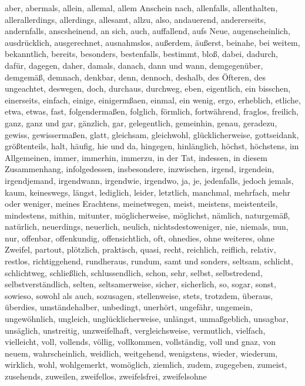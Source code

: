 \documentclass[a4paper,titlepage=true,twoside]{scrartcl}
\begin{document}
\begin{small}
aber, abermals, allein, allemal, allem Anschein nach, allenfalls, allenthalten,
allerallerdings, allerdings, allesamt, allzu, also, andauerend, andererseits,
andernfalls, anscsheinend, an sich, auch, auffallend, aufs Neue, augenscheinlich,
ausdrücklich, ausgerechnet, ausnahmslos, außerdem, äußerst, beinahe, bei weitem,
bekanntlich, bereits, besonders, bestenfalls, bestimmt, bloß, dabei,
dadurch, dafür, dagegen, daher, damals, danach, dann und wann, demgegenüber,
demgemäß, demnach, denkbar, denn, dennoch, deshalb, des Öfteren, des ungeachtet,
deswegen, doch, durchaus, durchweg, eben, eigentlich, ein bisschen, einerseits,
einfach, einige, einigermßaen, einmal, ein wenig, ergo, erheblich, etliche,
etwa, etwas, fast, folgendermaßen, folglich, förmlich, fortwährend, fraglos,
freilich, ganz, ganz und gar, gänzlich, gar, gelegentlich, gemeinhin,
genau, geradezu, gewiss, gewissermaßen, glatt, gleichsam, gleichwohl, 
glücklicherweise, gottseidank, größtenteils, halt, häufig, hie und da,
hingegen, hinlänglich, höchst, höchstens, im Allgemeinen, immer, immerhin, 
immerzu, in der Tat, indessen, in diesem Zusammenhang, infolgedessen,
insbesondere, inzwischen, irgend, irgendein, irgendjemand, irgendwann,
irgendwie, irgendwo, ja, je, jedenfalls, jedoch jemals, kaum, keineswegs,
längst, lediglich, leider, letztlich, manchmal, mehrfach, mehr oder weniger,
meines Erachtens, meinetwegen, meist, meistens, meistenteils,
mindestens, mithin, mitunter, möglicherweise, möglichst, nämlich, naturgemäß,
natürlich, neuerdings, neuerlich, neulich, nichtsdestoweniger, nie, niemals, 
nun, nur, offenbar, offenkundig, offensichtlich, oft, ohnedies, ohne weiteres,
ohne Zweifel, partout, plötzlich, praktisch, quasi, recht, reichlich,
reiflich, relativ, restlos, richtiggehend, rundheraus, rundum, samt und sonders,
seltsam, schlicht, schlichtweg, schließlich, schlussendlich, schon, sehr,
selbst, selbstredend, selbstverständlich, selten, seltsamerweise, sicher,
sicherlich, so, sogar, sonst, sowieso, sowohl als auch, sozusagen, stellenweise,
stets, trotzdem, überaus, überdies, umständehalber, unbedingt, unerhört, 
ungefähr, ungemein, ungewöhnlich, ungleich, unglücklicherweise, unlängst,
unmaßgeblich, unsagbar, unsäglich, unstreitig, unzweifelhaft, vergleichsweise,
vermutlich, vielfach, vielleicht, voll, vollends, völlig, vollkommen,
vollständig, voll und gnaz, von neuem, wahrscheinlich, weidlich, weitgehend,
wenigstens, wieder, wiederum, wirklich, wohl, wohlgemerkt, womöglich,
ziemlich, zudem, zugegeben, zumeist, zusehends, zuweilen, zweifellos, zweifelsfrei,
zweifelsohne
\end{small}
\end{document}

